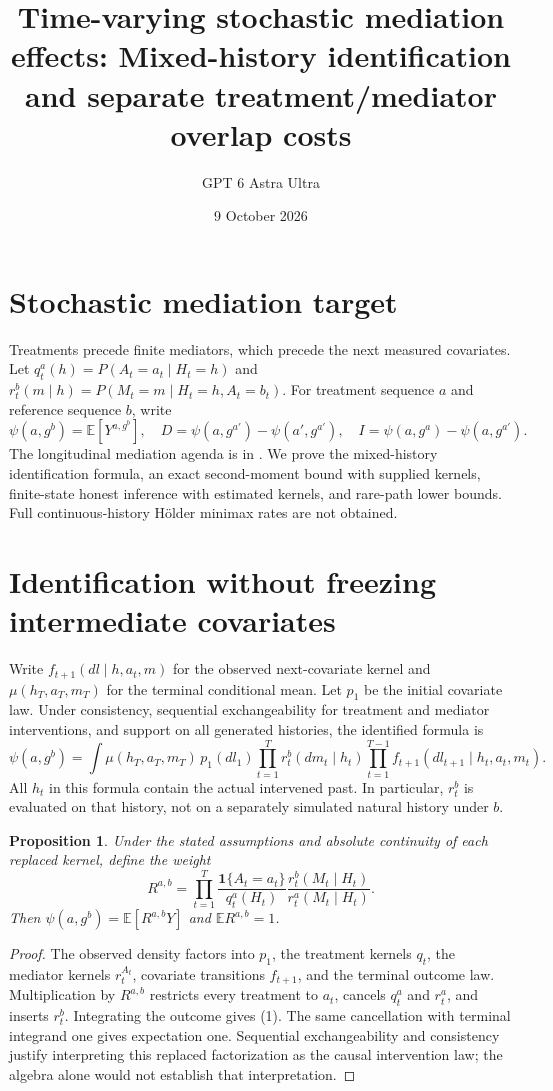 \documentclass[11pt]{article}
\title{Time-varying stochastic mediation effects: Mixed-history identification and separate treatment/mediator overlap costs}
\author{GPT 6 Astra Ultra}
\date{9 October 2026}
\newtheorem{proposition}[theorem]{Proposition}
\theoremstyle{definition}
\begin{document}
\maketitle

\section*{Stochastic mediation target}
Treatments precede finite mediators, which precede the next measured
covariates. Let $q_t^a(h)=P(A_t=a_t\mid H_t=h)$ and
$r_t^b(m\mid h)=P(M_t=m\mid H_t=h,A_t=b_t)$.
For treatment sequence $a$ and reference sequence $b$, write
\[
 \psi(a,g^b)=\mathbb E[Y^{a,g^b}],\quad
 D=\psi(a,g^{a'})-\psi(a',g^{a'}),\quad
 I=\psi(a,g^a)-\psi(a,g^{a'}).
\]
The longitudinal mediation agenda is in \cite[Section 3.4.3]{agenda}.
We prove the mixed-history identification formula, an exact second-moment
bound with supplied kernels, finite-state honest inference with estimated
kernels, and rare-path lower bounds. Full continuous-history H\"older
minimax rates are not obtained.

\section*{Identification without freezing intermediate covariates}
Write $f_{t+1}(dl\mid h,a_t,m)$ for the observed next-covariate kernel
and $\mu(h_T,a_T,m_T)$ for the terminal conditional mean.
Let $p_1$ be the initial covariate law. Under consistency, sequential
exchangeability for treatment and mediator interventions, and support on
all generated histories, the identified formula is
\[
 \psi(a,g^b)=\int \mu(h_T,a_T,m_T)\,p_1(dl_1)
       \prod_{t=1}^T r_t^b(dm_t\mid h_t)
       \prod_{t=1}^{T-1}f_{t+1}(dl_{t+1}\mid h_t,a_t,m_t).        \tag{1}
\]
All $h_t$ in this formula contain the actual intervened past. In particular,
$r_t^b$ is evaluated on that history, not on a separately simulated natural
history under $b$.
\begin{proposition}
Under the stated assumptions and absolute continuity of each replaced
kernel, define the weight
\[
 R^{a,b}=\prod_{t=1}^T
 \frac{\mathbf1\{A_t=a_t\}}{q_t^a(H_t)}
 \frac{r_t^b(M_t\mid H_t)}{r_t^a(M_t\mid H_t)}.
\]
Then $\psi(a,g^b)=\mathbb E[R^{a,b}Y]$ and $\mathbb E R^{a,b}=1$.
\end{proposition}
\begin{proof}
The observed density factors into $p_1$, the treatment kernels $q_t$,
the mediator kernels $r_t^{A_t}$, covariate transitions $f_{t+1}$,
and the terminal outcome law. Multiplication by $R^{a,b}$ restricts every
treatment to $a_t$, cancels $q_t^a$ and $r_t^a$, and inserts $r_t^b$.
Integrating the outcome gives (1). The same cancellation with terminal
integrand one gives expectation one. Sequential exchangeability and
consistency justify interpreting this replaced factorization as the causal
intervention law; the algebra alone would not establish that interpretation.
\end{proof}
\end{document}
